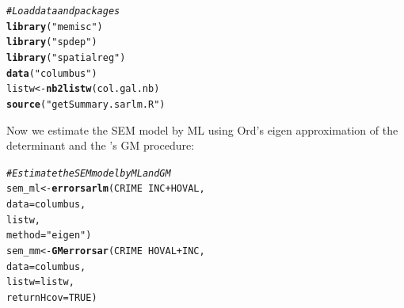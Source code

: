 \documentclass[english,12pt]{book}\usepackage[]{graphicx}\usepackage[]{xcolor}
\makeatletter
\newcommand{\hlnum}[1]{\textcolor[rgb]{0.686,0.059,0.569}{#1}}%
\newcommand{\hlstr}[1]{\textcolor[rgb]{0.192,0.494,0.8}{#1}}%
\newcommand{\hlcom}[1]{\textcolor[rgb]{0.678,0.584,0.686}{\textit{#1}}}%
\newcommand{\hlopt}[1]{\textcolor[rgb]{0,0,0}{#1}}%
\newcommand{\hlstd}[1]{\textcolor[rgb]{0.345,0.345,0.345}{#1}}%
\newcommand{\hlkwb}[1]{\textcolor[rgb]{0.69,0.353,0.396}{#1}}%
\newcommand{\hlkwc}[1]{\textcolor[rgb]{0.333,0.667,0.333}{#1}}%
\newcommand{\hlkwd}[1]{\textcolor[rgb]{0.737,0.353,0.396}{\textbf{#1}}}%
\newenvironment{kframe}{%
 \def\at@end@of@kframe{}%
 \ifinner\ifhmode%
  \def\at@end@of@kframe{\end{minipage}}%
  \begin{minipage}{\columnwidth}%
 \fi\fi%
 \def\FrameCommand##1{\hskip\@totalleftmargin \hskip-\fboxsep
 \colorbox{shadecolor}{##1}\hskip-\fboxsep
     \hskip-\linewidth \hskip-\@totalleftmargin \hskip\columnwidth}%
 \MakeFramed {\advance\hsize-\width
   \@totalleftmargin\z@ \linewidth\hsize
   \@setminipage}}%
 {\par\unskip\endMakeFramed%
 \at@end@of@kframe}
\newenvironment{knitrout}{}{} %
\makeatother
\begin{document}
\begin{knitrout}
\color{fgcolor}\begin{kframe}
\begin{alltt}
\hlcom{# Load data and packages}
\hlkwd{library}\hlstd{(}\hlstr{"memisc"}\hlstd{)}
\hlkwd{library}\hlstd{(}\hlstr{"spdep"}\hlstd{)}
\hlkwd{library}\hlstd{(}\hlstr{"spatialreg"}\hlstd{)}
\hlkwd{data}\hlstd{(}\hlstr{"columbus"}\hlstd{)}
\hlstd{listw} \hlkwb{<-} \hlkwd{nb2listw}\hlstd{(col.gal.nb)}
\hlkwd{source}\hlstd{(}\hlstr{"getSummary.sarlm.R"}\hlstd{)}
\end{alltt}
\end{kframe}
\end{knitrout}

Now we estimate the SEM model by ML using Ord's eigen approximation of the determinant and the \cite{kelejian1999generalized}'s GM procedure:

\begin{knitrout}
\color{fgcolor}\begin{kframe}
\begin{alltt}
\hlcom{# Estimate the SEM model by ML and GM}
\hlstd{sem_ml} \hlkwb{<-} \hlkwd{errorsarlm}\hlstd{(CRIME} \hlopt{~} \hlstd{INC} \hlopt{+} \hlstd{HOVAL,}
                     \hlkwc{data} \hlstd{= columbus,}
                     \hlstd{listw,}
                     \hlkwc{method} \hlstd{=} \hlstr{"eigen"}\hlstd{)}
\hlstd{sem_mm}    \hlkwb{<-} \hlkwd{GMerrorsar}\hlstd{(CRIME} \hlopt{~} \hlstd{HOVAL} \hlopt{+} \hlstd{INC,}
                  \hlkwc{data} \hlstd{=  columbus,}
                  \hlkwc{listw} \hlstd{= listw,}
                  \hlkwc{returnHcov} \hlstd{=}  \hlnum{TRUE}\hlstd{)}
\end{alltt}
\end{kframe}
\end{knitrout}
\end{document}
